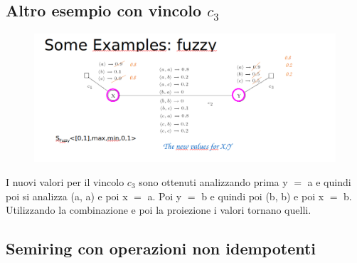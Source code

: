 \subsection{Altro esempio con vincolo \texorpdfstring{$c_3$}{c3}}
\begin{figure}[htp]
    \centering
    \includegraphics[width=16cm, keepaspectratio]{img/Cap5/FUZZY2.png}
\end{figure}
I nuovi valori per il vincolo $c_3$ sono ottenuti analizzando prima y $=$ a e
quindi poi si analizza (a, a) e poi x $=$ a. Poi y $=$ b e quindi poi (b, b) e
poi x $=$ b. Utilizzando la combinazione e poi la proiezione i valori tornano
quelli.
\subsection{Semiring con operazioni non idempotenti}
